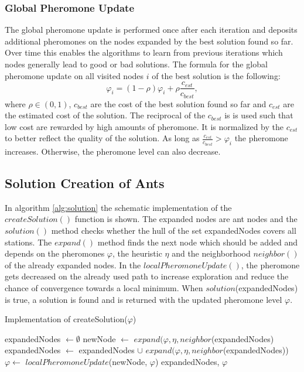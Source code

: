 \subsubsection{Global Pheromone Update}
The global pheromone update is performed once after each iteration and deposits additional pheromones on the nodes expanded by the best solution found so far. Over time this enables the algorithms to learn from previous iterations which nodes generally lead to good or bad solutions. The formula for the global pheromone update on all visited nodes $i$ of the best solution is the following:
$$\varphi_i = (1-\rho) \varphi_i + \rho \frac{c_{est}}{c_{best}},$$
where $\rho \in (0,1)$, $c_{best}$ are the cost of the best solution found so far and $c_{est}$ are the estimated cost of the solution. The reciprocal of the $c_{best}$ is is used such that low cost are rewarded by high amounts of pheromone. It is normalized by the $c_{est}$ to better reflect the quality of the solution. As long as $\frac{c_{est}}{c_{best}} > \varphi_i$ the pheromone increases. Otherwise, the pheromone level can also decrease.

\subsection{Solution Creation of Ants}
In algorithm \ref{alg:solution} the schematic implementation of the $createSolution()$ function is shown. The expanded nodes are ant nodes and the $solution()$ method checks whether the hull of the set expandedNodes covers all stations. The $expand()$ method finds the next node which should be added and depends on the pheromones $\varphi$, the heuristic $\eta$ and the neighborhood $neighbor()$ of the already expanded nodes. In the $localPheromoneUpdate()$, the pheromone gets decreased on the already used path to increase exploration and reduce the chance of convergence towards a local minimum. When $solution$(expandedNodes) is true, a solution is found and is returned with the updated pheromone level $\varphi$. 
\begin{algorithm}[h]
	\caption{Implementation of createSolution($\varphi$)}
	\label{alg:solution}
	\begin{algorithmic}[1]
		\State expandedNodes $\gets \emptyset$
		\State newNode $\gets$ $expand(\varphi, \eta, neighbor$(expandedNodes)
		\State expandedNodes $\gets$ expandedNodes $\cup$ $expand(\varphi, \eta, neighbor$(expandedNodes))
		\State $\varphi \gets$ $localPheromoneUpdate$(newNode, $\varphi$)
		\EndWhile
		\State \Return expandedNodes, $\varphi$
	\end{algorithmic}
\end{algorithm}

